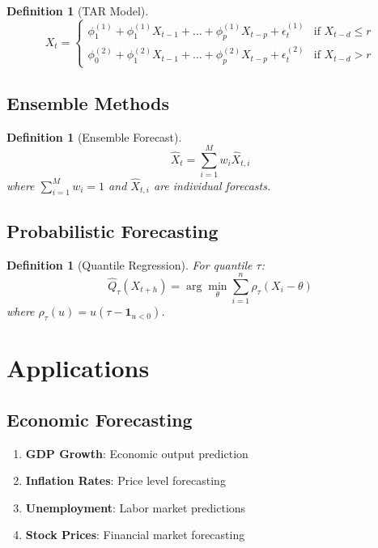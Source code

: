 \documentclass[11pt,a4paper]{article}
\newtheorem{definition}[theorem]{Definition}
\begin{document}
\begin{definition}[TAR Model]
$$X_t = \begin{cases}
\phi_1^{(1)} + \phi_1^{(1)}X_{t-1} + \ldots + \phi_p^{(1)}X_{t-p} + \epsilon_t^{(1)} & \text{if } X_{t-d} \leq r \\
\phi_0^{(2)} + \phi_1^{(2)}X_{t-1} + \ldots + \phi_p^{(2)}X_{t-p} + \epsilon_t^{(2)} & \text{if } X_{t-d} > r
\end{cases}$$
\end{definition}

\subsection{Ensemble Methods}

\begin{definition}[Ensemble Forecast]
$$\hat{X}_t = \sum_{i=1}^M w_i \hat{X}_{t,i}$$
where $\sum_{i=1}^M w_i = 1$ and $\hat{X}_{t,i}$ are individual forecasts.
\end{definition}

\subsection{Probabilistic Forecasting}

\begin{definition}[Quantile Regression]
For quantile $\tau$:
$$\hat{Q}_\tau(X_{t+h}) = \arg\min_{\theta} \sum_{i=1}^n \rho_\tau(X_i - \theta)$$
where $\rho_\tau(u) = u(\tau - \mathbf{1}_{u < 0})$.
\end{definition}

\section{Applications}

\subsection{Economic Forecasting}

\begin{enumerate}
\item \textbf{GDP Growth}: Economic output prediction
\item \textbf{Inflation Rates}: Price level forecasting
\item \textbf{Unemployment}: Labor market predictions
\item \textbf{Stock Prices}: Financial market forecasting
\end{enumerate}
\end{document}
